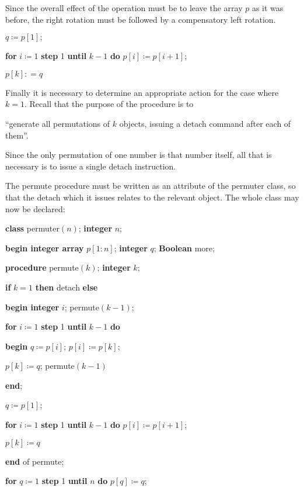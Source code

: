 \noindent
Since the overall effect of the operation must be to leave the array $p$ as it was before, the right rotation must be followed by a compensatory left rotation.

\quad $q\coloneq p[1];$

\quad \textbf{for} $i\coloneq 1$ \textbf{step} 1 \textbf{until} $k - 1$ \textbf{do} $p[i]\coloneq p[i + 1]$;

\quad $p[k]: = q$

\noindent
Finally it is necessary to determine an appropriate action for the case where $k = 1$. Recall that the purpose of the procedure is to 

\parindent\quad ``generate all permutations of $k$ objects, issuing a detach command after each of them''.

\noindent
Since the only permutation of one number is that number itself, all that is necessary is to issue a single detach instruction.

The permute procedure must be written as an attribute of the permuter class, so that the detach which it issues relates to the relevant object. The whole class may now be declared:

\quad \textbf{class} permuter$(n)$; \textbf{integer} $n$;

\quad \textbf{begin integer array} $p[1:n]$; \textbf{integer} $q$; \textbf{Boolean} more;

\quad \quad \textbf{procedure} permute$(k)$; \textbf{integer} $k$;

\quad \quad \textbf{if} $k = 1$ \textbf{then} detach \textbf{else}

\quad \quad \textbf{begin integer} $i$; permute$(k - 1)$;

\quad \quad \quad \textbf{for} $i\coloneq 1$ \textbf{step} 1 \textbf{until} $k - 1$ \textbf{do}

\quad \quad \quad \textbf{begin} $q\coloneq p[i]$; $p[i]\coloneq p[k]$;

\quad \quad \quad \quad $p[k]\coloneq q$; permute$(k - 1)$

\quad \quad \quad \textbf{end};

\quad \quad \quad $q\coloneq p[1]$;

\quad \quad \quad \textbf{for} $i\coloneq 1$ \textbf{step} 1 \textbf{until} $k - 1$ \textbf{do} $p[i] \coloneq p[i + 1]$;

\quad \quad \quad $p[k]\coloneq q$

\quad \quad \textbf{end} of permute;

\quad \quad \textbf{for} $q\coloneq 1$ \textbf{step} 1 \textbf{until} $n$ \textbf{do} $p[q] \coloneq q$;

